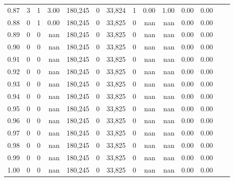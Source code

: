 \begin{tabular}{rrrrrrrrrrrrrr}
0.87 &      3 &    1 &    3.00 &  180,245 &        0 &  33,824 &       1 &  0.00 &  1.00 &  0.00 &      0.00 \\
0.88 &      0 &    1 &    0.00 &  180,245 &        0 &  33,825 &       0 &   nan &   nan &  0.00 &      0.00 \\
0.89 &      0 &    0 &     nan &  180,245 &        0 &  33,825 &       0 &   nan &   nan &  0.00 &      0.00 \\
0.90 &      0 &    0 &     nan &  180,245 &        0 &  33,825 &       0 &   nan &   nan &  0.00 &      0.00 \\
0.91 &      0 &    0 &     nan &  180,245 &        0 &  33,825 &       0 &   nan &   nan &  0.00 &      0.00 \\
0.92 &      0 &    0 &     nan &  180,245 &        0 &  33,825 &       0 &   nan &   nan &  0.00 &      0.00 \\
0.93 &      0 &    0 &     nan &  180,245 &        0 &  33,825 &       0 &   nan &   nan &  0.00 &      0.00 \\
0.94 &      0 &    0 &     nan &  180,245 &        0 &  33,825 &       0 &   nan &   nan &  0.00 &      0.00 \\
0.95 &      0 &    0 &     nan &  180,245 &        0 &  33,825 &       0 &   nan &   nan &  0.00 &      0.00 \\
0.96 &      0 &    0 &     nan &  180,245 &        0 &  33,825 &       0 &   nan &   nan &  0.00 &      0.00 \\
0.97 &      0 &    0 &     nan &  180,245 &        0 &  33,825 &       0 &   nan &   nan &  0.00 &      0.00 \\
0.98 &      0 &    0 &     nan &  180,245 &        0 &  33,825 &       0 &   nan &   nan &  0.00 &      0.00 \\
0.99 &      0 &    0 &     nan &  180,245 &        0 &  33,825 &       0 &   nan &   nan &  0.00 &      0.00 \\
1.00 &      0 &    0 &     nan &  180,245 &        0 &  33,825 &       0 &   nan &   nan &  0.00 &      0.00 \\
\bottomrule
\end{tabular}
